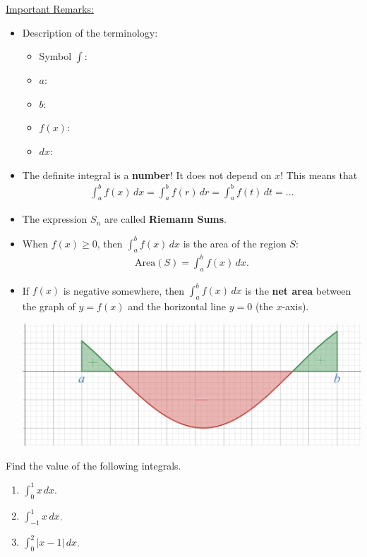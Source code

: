 \documentclass[12pt,a4paper]{article}
\newcounter{example}[section]
\begin{document}
\underline{Important Remarks:}
	\begin{itemize}
	\item Description of the terminology:
		\begin{itemize}
		\item Symbol $\displaystyle \int$:
		\item $a$: 
		\item $b$:
		\item $f(x)$: 
		\item $dx$: 
		\end{itemize}
	\item The definite integral is a \textbf{number}! It does not depend on $x$! This means that
		\begin{align*}
		\int_a^b f(x) \, dx = \int_a^b f(r) \, dr = \int_a^b f(t) \, dt = \ldots
		\end{align*}
	\item The expression $S_n$ are called \textbf{Riemann Sums}.
	\item When $f(x) \geq 0$, then $\displaystyle\int_a^b f(x) \, dx$ is the area of the region $S$:
		\begin{align*}
		\mathrm{Area}(S) = \int_a^b f(x) \, dx .
		\end{align*}
	\item If $f(x)$ is negative somewhere, then $\displaystyle \int_a^b f(x) \, dx$ is the \textbf{net area} between the graph of $y = f(x)$ and the horizontal line $y = 0$ (the $x$-axis).
		\begin{center}
		\includegraphics[scale=0.35]{NetArea.png}
		\end{center}
	\end{itemize}
	
	\newpage
	
	\begin{example}
	Find the value of the following integrals.
		\begin{multicols}{4}
		\begin{enumerate}[label=\textbf{(\alph*)}]
		\item $\displaystyle \int_0^1 x \, dx$.
		\item $\displaystyle \int_{-1}^1 x \, dx$.
		\item $\displaystyle \int_0^2 |x - 1| \, dx$.
		\end{enumerate}
		\end{multicols}
	\end{example}
	
\end{document}
